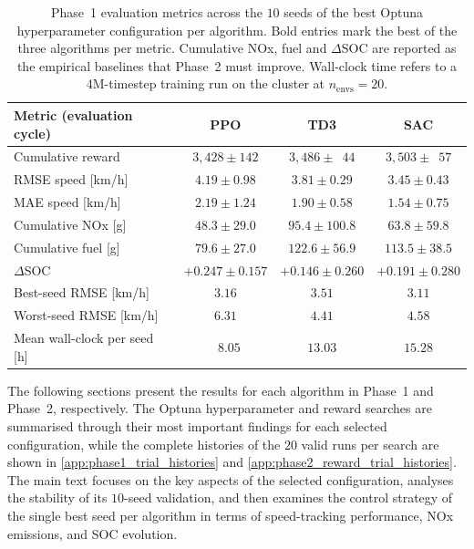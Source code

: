 \begin{table}[H]
  \centering
  \small
  \begin{tabular}{lccc}
    \hline
    \textbf{Metric (evaluation cycle)} & \textbf{PPO} & \textbf{TD3} & \textbf{SAC} \\
    \hline
    Cumulative reward                   & $3{,}428 \pm 142$ & $3{,}486 \pm \phantom{0}44$ & $3{,}503 \pm \phantom{0}57$ \\
    \ac{RMSE} speed [km/h]              & $4.19 \pm 0.98$   & $3.81 \pm 0.29$             & $\mathbf{3.45 \pm 0.43}$ \\
    \ac{MAE} speed [km/h]               & $2.19 \pm 1.24$   & $1.90 \pm 0.58$             & $\mathbf{1.54 \pm 0.75}$ \\
    Cumulative \ac{NOx} [g]             & $\mathbf{48.3 \pm 29.0}$ & $95.4 \pm 100.8$      & $63.8 \pm 59.8$ \\
    Cumulative fuel [g]                 & $\mathbf{79.6 \pm 27.0}$ & $122.6 \pm 56.9$      & $113.5 \pm 38.5$ \\
    $\Delta$\ac{SOC}                    & $+0.247 \pm 0.157$ & $+0.146 \pm 0.260$    & $+0.191 \pm 0.280$ \\
    Best-seed \ac{RMSE} [km/h]          & $3.16$            & $3.51$                      & $3.11$ \\
    Worst-seed \ac{RMSE} [km/h]         & $6.31$            & $4.41$                      & $4.58$ \\
    Mean wall-clock per seed [h]        & $\mathbf{\phantom{0}8.05}$ & $13.03$            & $15.28$ \\
    \hline
  \end{tabular}
  \caption[Phase~1 evaluation summary]{Phase~1 evaluation metrics across the $10$ seeds of the best Optuna hyperparameter configuration per algorithm. Bold entries mark the best of the three algorithms per metric. Cumulative \ac{NOx}, fuel and $\Delta$\ac{SOC} are reported as the empirical baselines that Phase~2 must improve. Wall-clock time refers to a 4M-timestep training run on the cluster at $n_{\text{envs}} = 20$.}
  \label{tab:phase1_summary}
\end{table}

The following sections present the results for each algorithm in Phase~1 and Phase~2, respectively. The Optuna hyperparameter and reward searches are summarised through their most important findings for each selected configuration, while the complete histories of the $20$ valid runs per search are shown in \autoref{app:phase1_trial_histories} and \autoref{app:phase2_reward_trial_histories}. The main text focuses on the key aspects of the selected configuration, analyses the stability of its $10$-seed validation, and then examines the control strategy of the single best seed per algorithm in terms of speed-tracking performance, \ac{NOx} emissions, and \ac{SOC} evolution.

